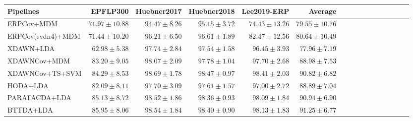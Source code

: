 \begin{tabular}{@{}lrrrrrrrrrrrrrrr@{}}
\midrule 
Pipelines & EPFLP300 & Huebner2017 & Huebner2018 & Lee2019-ERP & Average \\
\midrule
ERPCov+MDM & $71.97\pm10.88$ & $94.47\pm8.26$ & $95.15\pm3.72$ & $74.43\pm13.26$ & $79.55\pm10.76$ \\
ERPCov(svdn4)+MDM & $71.44\pm10.20$ & $96.21\pm6.50$ & $96.61\pm1.89$ & $82.47\pm12.56$ & $80.64\pm10.49$ \\
XDAWN+LDA & $62.98\pm5.38$ & $97.74\pm2.84$ & $97.54\pm1.58$ & $96.45\pm3.93$ & $77.96\pm7.19$ \\
XDAWNCov+MDM & $83.20\pm9.05$ & $98.07\pm2.09$ & $97.78\pm1.04$ & $97.70\pm2.68$ & $88.98\pm7.53$ \\
XDAWNCov+TS+SVM & $84.29\pm8.53$ & \boldmath$98.69\pm1.78$ & \boldmath$98.47\pm0.97$ & \boldmath$98.41\pm2.03$ & $90.82\pm6.82$ \\HODA+LDA & $82.09\pm8.11$ & $97.70\pm3.09$ & $97.61\pm1.57$ & $97.00\pm2.72$ & $88.89\pm7.04$ \\
PARAFACDA+LDA & $85.13\pm8.72$ & $98.52\pm1.86$ & $98.36\pm0.93$ & $98.09\pm1.84$ & $90.94\pm6.90$ \\
BTTDA+LDA & \boldmath$85.95\pm8.06$ & $98.54\pm1.84$ & $98.40\pm0.90$ & $98.13\pm1.83$ & \boldmath$91.25\pm6.77$ \\
\bottomrule
\end{tabular}


